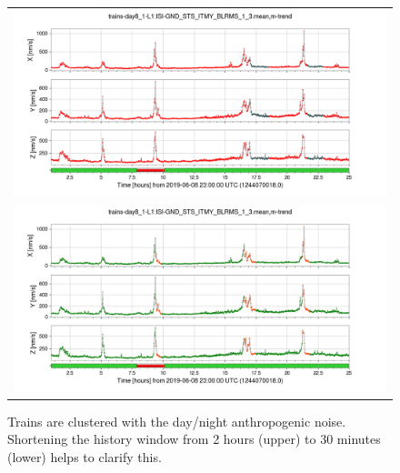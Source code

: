 \documentclass[colorlinks=true,pdfstartview=FitV,linkcolor=blue,
            citecolor=red,urlcolor=magenta]{ligodoc}
\begin{document}
\begin{figure}
  \begin{minipage}[c]{0.67\textwidth}
    \begin{tabular}{c}
      \includegraphics[width=\textwidth]{assets/report1/trains-day8_1-L1:ISI-GND_STS_ITMY_BLRMS_1_3mean,m-trend.png}\\
      \includegraphics[width=\textwidth]{assets/report1/30m-trains-day8_1-L1:ISI-GND_STS_ITMY_BLRMS_1_3mean,m-trend.png}
    \end{tabular}
  \end{minipage}\hfill
  \begin{minipage}[t]{0.3\textwidth}
    \caption{Trains are clustered with the day/night anthropogenic noise. Shortening the history window from 2 hours (upper) to 30 minutes (lower)  helps to clarify this.}\label{fig:anth}
  \end{minipage}
\end{figure}


\end{document}
